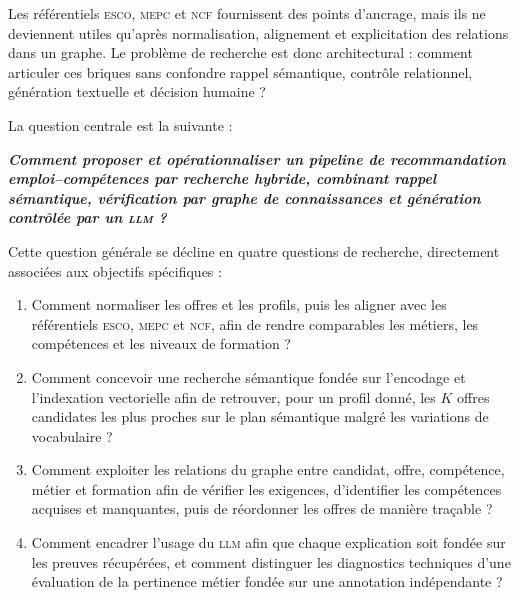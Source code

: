 \documentclass[12pt,twoside]{report}
\newcommand{\ESCO}{\textsc{esco}}
\newcommand{\MEPC}{\textsc{mepc}}
\newcommand{\NCF}{\textsc{ncf}}
\newcommand{\LLM}{\textsc{llm}}
\begin{document}
Les référentiels \ESCO{}, \MEPC{} et \NCF{} fournissent des points d'ancrage, mais ils ne deviennent utiles qu'après normalisation, alignement et explicitation des relations dans un graphe. Le problème de recherche est donc architectural : comment articuler ces briques sans confondre rappel sémantique, contrôle relationnel, génération textuelle et décision humaine ?

La question centrale est la suivante :
\begin{center}
\begin{tcolorbox}[problematiquebox,width=0.94\textwidth]
\centering
\textit{\textbf{Comment proposer et opérationnaliser un pipeline de recommandation emploi--compétences par recherche hybride, combinant rappel sémantique, vérification par graphe de connaissances et génération contrôlée par un \LLM{} ?}}
\end{tcolorbox}
\end{center}

Cette question générale se décline en quatre questions de recherche, directement associées aux objectifs spécifiques :
\begin{enumerate}
    \item Comment normaliser les offres et les profils, puis les aligner avec les référentiels \ESCO{}, \MEPC{} et \NCF{}, afin de rendre comparables les métiers, les compétences et les niveaux de formation ?
    \item Comment concevoir une recherche sémantique fondée sur l'encodage et l'indexation vectorielle afin de retrouver, pour un profil donné, les $K$ offres candidates les plus proches sur le plan sémantique malgré les variations de vocabulaire ?
    \item Comment exploiter les relations du graphe entre candidat, offre, compétence, métier et formation afin de vérifier les exigences, d'identifier les compétences acquises et manquantes, puis de réordonner les offres de manière traçable ?
    \item Comment encadrer l'usage du \LLM{} afin que chaque explication soit fondée sur les preuves récupérées, et comment distinguer les diagnostics techniques d'une évaluation de la pertinence métier fondée sur une annotation indépendante ?
\end{enumerate}

\vspace{-0.5cm}
\end{document}
